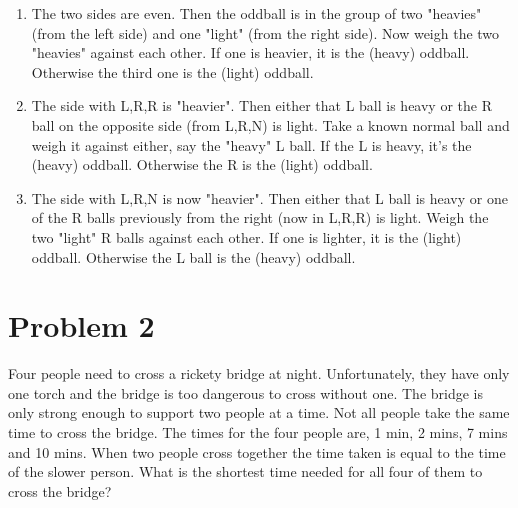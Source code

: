 \documentclass{article}
\begin{document}
\begin{enumerate}[label=\Alph*.]
\begin{enumerate}[label=\textbf{Case \arabic*.}]
            \begin{enumerate}[label=(\alph*)]
                \item The two sides are even. Then the oddball is in the group of two "heavies" (from the left side) and one "light" (from the right side).
                Now weigh the two "heavies" against each other. If one is heavier, it is the (heavy) oddball. Otherwise the third one is the (light) oddball.
                \item The side with {L,R,R} is "heavier". Then either that L ball is heavy or the R ball on the opposite side (from {L,R,N}) is light. 
                Take a known normal ball and weigh it against either, say the "heavy" L ball. If the L is heavy, it's the (heavy) oddball. Otherwise the R is the (light) oddball.
                \item The side with {L,R,N} is now "heavier". Then either that L ball is heavy or one of the R balls previously from the right (now in {L,R,R}) is light.
                Weigh the two "light" R balls against each other. If one is lighter, it is the (light) oddball. Otherwise the L ball is the (heavy) oddball.
            \end{enumerate}
        \end{enumerate}
    \end{enumerate}
    

    \section*{Problem 2}
    Four people need to cross a rickety bridge at night. Unfortunately, they have only
    one torch and the bridge is too dangerous to cross without one. The bridge is only
    strong enough to support two people at a time. Not all people take the same time
    to cross the bridge. The times for the four people are, 1 min, 2 mins, 7 mins and
    10 mins. When two people cross together the time taken is equal to the time of
    the slower person. What is the shortest time needed for all four of them to cross
    the bridge?
    
\end{document}
